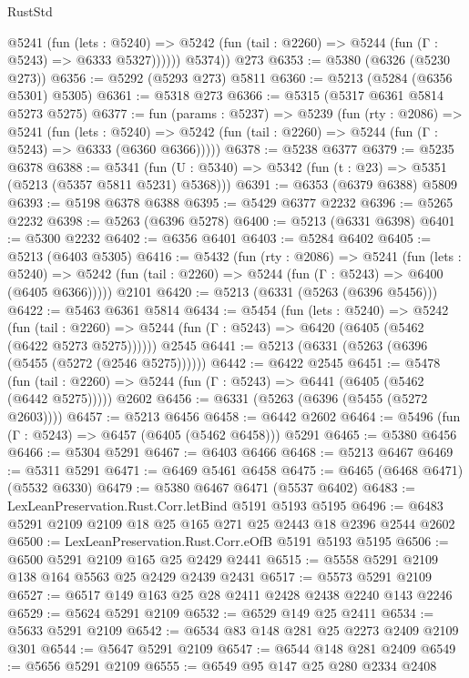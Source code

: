 \begin{lexlean}{RustStd}
\begin{coremodule}
            @5241
              (fun (lets : @5240) =>
              @5242 (fun (tail : @2260) => @5244 (fun (Γ : @5243) => @6333 @5327))))))
        @5374))
    @273
@6353 := @5380 (@6326 (@5230 @273))
@6356 := @5292 (@5293 @273) @5811
@6360 := @5213 (@5284 (@6356 @5301) @5305)
@6361 := @5318 @273
@6366 := @5315 (@5317 @6361 @5814 @5273 @5275)
@6377 := fun (params : @5237) =>
  @5239
    (fun (rty : @2086) =>
    @5241
      (fun (lets : @5240) =>
      @5242 (fun (tail : @2260) => @5244 (fun (Γ : @5243) => @6333 (@6360 @6366)))))
@6378 := @5238 @6377
@6379 := @5235 @6378
@6388 := @5341 (fun (U : @5340) => @5342 (fun (t : @23) => @5351 (@5213 (@5357 @5811 @5231) @5368)))
@6391 := @6353 (@6379 @6388) @5809
@6393 := @5198 @6378 @6388
@6395 := @5429 @6377 @2232
@6396 := @5265 @2232
@6398 := @5263 (@6396 @5278)
@6400 := @5213 (@6331 @6398)
@6401 := @5300 @2232
@6402 := @6356 @6401
@6403 := @5284 @6402
@6405 := @5213 (@6403 @5305)
@6416 := @5432
    (fun (rty : @2086) =>
    @5241
      (fun (lets : @5240) =>
      @5242 (fun (tail : @2260) => @5244 (fun (Γ : @5243) => @6400 (@6405 @6366)))))
    @2101
@6420 := @5213 (@6331 (@5263 (@6396 @5456)))
@6422 := @5463 @6361 @5814
@6434 := @5454
    (fun (lets : @5240) =>
    @5242
      (fun (tail : @2260) => @5244 (fun (Γ : @5243) => @6420 (@6405 (@5462 (@6422 @5273 @5275))))))
    @2545
@6441 := @5213 (@6331 (@5263 (@6396 (@5455 (@5272 (@2546 @5275))))))
@6442 := @6422 @2545
@6451 := @5478
    (fun (tail : @2260) => @5244 (fun (Γ : @5243) => @6441 (@6405 (@5462 (@6442 @5275)))))
    @2602
@6456 := @6331 (@5263 (@6396 (@5455 (@5272 @2603))))
@6457 := @5213 @6456
@6458 := @6442 @2602
@6464 := @5496 (fun (Γ : @5243) => @6457 (@6405 (@5462 @6458))) @5291
@6465 := @5380 @6456
@6466 := @5304 @5291
@6467 := @6403 @6466
@6468 := @5213 @6467
@6469 := @5311 @5291
@6471 := @6469 @5461 @6458
@6475 := @6465 (@6468 @6471) (@5532 @6330)
@6479 := @5380 @6467 @6471 (@5537 @6402)
@6483 := LexLeanPreservation.Rust.Corr.letBind @5191 @5193 @5195
@6496 := @6483 @5291 @2109 @2109 @18 @25 @165 @271 @25 @2443 @18 @2396 @2544 @2602
@6500 := LexLeanPreservation.Rust.Corr.eOfB @5191 @5193 @5195
@6506 := @6500 @5291 @2109 @165 @25 @2429 @2441
@6515 := @5558 @5291 @2109 @138 @164 @5563 @25 @2429 @2439 @2431
@6517 := @5573 @5291 @2109
@6527 := @6517 @149 @163 @25 @28 @2411 @2428 @2438 @2240 @143 @2246
@6529 := @5624 @5291 @2109
@6532 := @6529 @149 @25 @2411
@6534 := @5633 @5291 @2109
@6542 := @6534 @83 @148 @281 @25 @2273 @2409 @2109 @301
@6544 := @5647 @5291 @2109
@6547 := @6544 @148 @281 @2409
@6549 := @5656 @5291 @2109
@6555 := @6549 @95 @147 @25 @280 @2334 @2408

\end{coremodule}
\end{lexlean}
